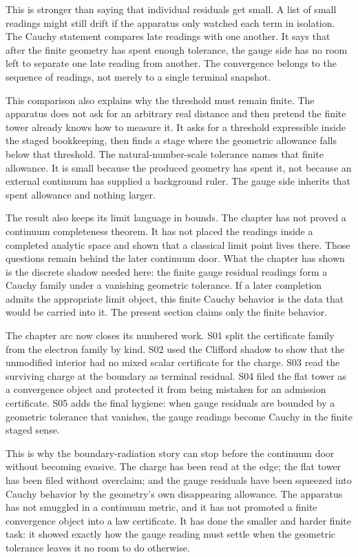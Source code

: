 This is stronger than saying that individual residuals get small. A list of
small readings might still drift if the apparatus only watched each term in
isolation. The Cauchy statement compares late readings with one another. It
says that after the finite geometry has spent enough tolerance, the gauge side
has no room left to separate one late reading from another. The convergence
belongs to the sequence of readings, not merely to a single terminal snapshot.

This comparison also explains why the threshold must remain finite. The
apparatus does not ask for an arbitrary real distance and then pretend the
finite tower already knows how to measure it. It asks for a threshold expressible
inside the staged bookkeeping, then finds a stage where the geometric
allowance falls below that threshold. The natural-number-scale tolerance names that finite
allowance. It is small because the produced geometry has spent it, not because
an external continuum has supplied a background ruler. The gauge side inherits
that spent allowance and nothing larger.

The result also keeps its limit language in bounds. The chapter has not proved
a continuum completeness theorem. It has not placed the readings inside a
completed analytic space and shown that a classical limit point lives there.
Those questions remain behind the later continuum door. What the chapter has
shown is the discrete shadow needed here: the finite gauge residual readings
form a Cauchy family under a vanishing geometric tolerance. If a later
completion admits the appropriate limit object, this finite Cauchy behavior is
the data that would be carried into it. The present section claims only the
finite behavior.

The chapter arc now closes its numbered work. S01 split the certificate family
from the electron family by kind. S02 used the Clifford shadow to show that the
unmodified interior had no mixed scalar certificate for the charge. S03 read
the surviving charge at the boundary as terminal residual. S04 filed the flat
tower as a convergence object and protected it from being mistaken for an
admission certificate. S05 adds the final hygiene: when gauge residuals are
bounded by a geometric tolerance that vanishes, the gauge readings become
Cauchy in the finite staged sense.

This is why the boundary-radiation story can stop before the continuum door
without becoming evasive. The charge has been read at the edge; the flat tower
has been filed without overclaim; and the gauge residuals have been squeezed
into Cauchy behavior by the geometry's own disappearing allowance. The
apparatus has not smuggled in a continuum metric, and it has not promoted a
finite convergence object into a law certificate. It has done the smaller and
harder finite task: it showed exactly how the gauge reading must settle when the
geometric tolerance leaves it no room to do otherwise.

